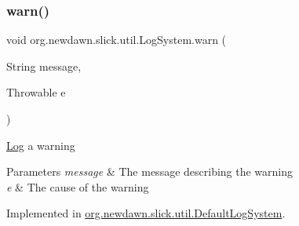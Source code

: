\subsubsection{\texorpdfstring{warn()}{warn()}\hspace{0.1cm}{\footnotesize\ttfamily [2/2]}}
{\footnotesize\ttfamily void org.\+newdawn.\+slick.\+util.\+Log\+System.\+warn (\begin{DoxyParamCaption}\item[{String}]{message,  }\item[{Throwable}]{e }\end{DoxyParamCaption})}

\mbox{\hyperlink{classorg_1_1newdawn_1_1slick_1_1util_1_1_log}{Log}} a warning


\begin{DoxyParams}{Parameters}
{\em message} & The message describing the warning \\
\hline
{\em e} & The cause of the warning \\
\hline
\end{DoxyParams}


Implemented in \mbox{\hyperlink{classorg_1_1newdawn_1_1slick_1_1util_1_1_default_log_system_ab630bdef457c3881ef3d8fdcedf6d8bf}{org.\+newdawn.\+slick.\+util.\+Default\+Log\+System}}.

